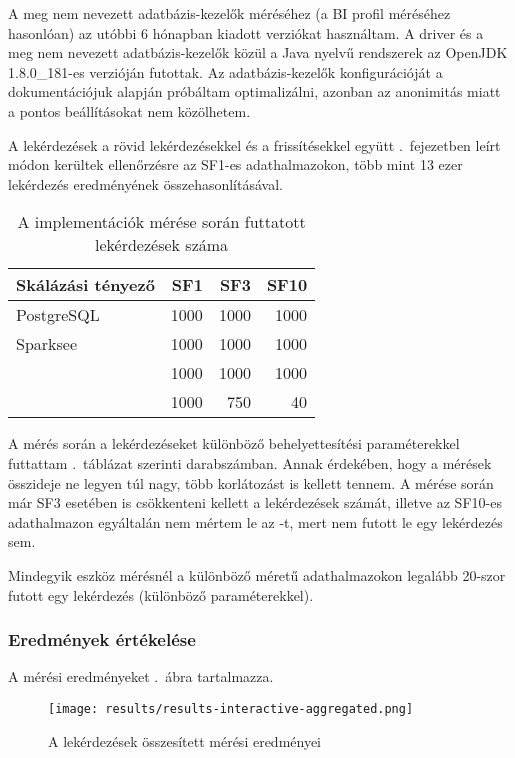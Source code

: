 A meg nem nevezett adatbázis-kezelők méréséhez (a BI profil méréséhez hasonlóan) az utóbbi 6 hónapban kiadott verziókat használtam. A driver és a meg nem nevezett adatbázis-kezelők közül a Java nyelvű rendszerek az OpenJDK 1.8.0\_181-es verzióján futottak. Az adatbázis-kezelők konfigurációját a dokumentációjuk alapján próbáltam optimalizálni, azonban az anonimitás miatt a pontos beállításokat nem közölhetem.

A lekérdezések a rövid lekérdezésekkel és a frissítésekkel együtt .~fejezetben leírt módon kerültek ellenőrzésre az SF1-es adathalmazokon, több mint 13 ezer lekérdezés eredményének összehasonlításával.

\begin{table}
	\centering
	\begin{tabular}{|l|r|r|r|}
		\toprule
		Skálázási tényező & SF1 & SF3 & SF10 \\
		\midrule
		PostgreSQL & 1000 & 1000 & 1000 \\
		Sparksee & 1000 & 1000 & 1000 \\
		\virtuoso & 1000 & 1000 & 1000 \\
		\stardog & 1000 & 750 & 40 \\
		\bottomrule
	\end{tabular}
	\caption{A implementációk mérése során futtatott lekérdezések száma}
	\label{tab:query-count}
\end{table}

A mérés során a lekérdezéseket különböző behelyettesítési paraméterekkel futtattam .~táblázat szerinti darabszámban. Annak érdekében, hogy a mérések összideje ne legyen túl nagy, több korlátozást is kellett tennem. A \stardog mérése során már SF3 esetében is csökkenteni kellett a lekérdezések számát, illetve az SF10-es adathalmazon egyáltalán nem mértem le az \stardog-t, mert nem futott le egy lekérdezés sem.

Mindegyik eszköz mérésnél a különböző méretű adathalmazokon legalább 20-szor futott egy lekérdezés (különböző paraméterekkel).


\subsubsection{Eredmények értékelése}

A mérési eredményeket .~ábra tartalmazza.

\begin{figure}
	\centering
	\texttt{[image: results/results-interactive-aggregated.png]}
	\caption{A lekérdezések összesített mérési eredményei}
	\label{fig:results-interactive-aggregated}
\end{figure}

